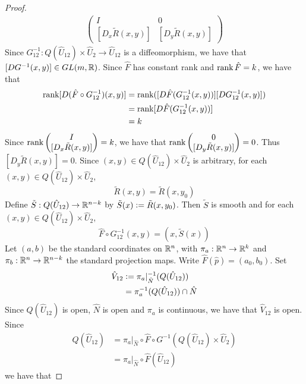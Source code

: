 \documentclass{book}
\begin{document}
\begin{proof}
\begin{align*}
\begin{pmatrix}
				I                & 0 \\
				[D_x \tilde{R}(x,y)]    & [D_y \tilde{R}(x,y)]   
			\end{pmatrix}
		\end{align*}
		Since $G_{12}^{-1}: Q(\hat{U}_{12}) \times \hat{U}_2 \rightarrow \hat{U}_{12}$ is a diffeomorphism, we have that $[DG^{-1}(x, y)] \in GL(m, \mathbb{R})$. Since $\hat{F}$ has constant rank and $\operatorname{\text{rank}} \hat{F} = k$, we have that
		\begin{align*}
			\operatorname{\text{rank}} [D(\hat{F} \circ G_{12}^{-1})(x,y)] 
			& = \operatorname{\text{rank}} ([D\hat{F}(G_{12}^{-1}(x,y))] [DG_{12}^{-1}(x,y)]) \\
			& = \operatorname{\text{rank}} [D\hat{F}(G_{12}^{-1}(x,y))] \\
			& = k
		\end{align*}
		Since $\operatorname{\text{rank}} 
		\begin{pmatrix}
			I \\
			[D_x \tilde{R}(x,y)]  
		\end{pmatrix}
		= k$, we have that $\operatorname{\text{rank}} 
		\begin{pmatrix}
		0 \\
		[D_y \tilde{R}(x,y)]  
		\end{pmatrix}
		= 0$. Thus $[D_y \tilde{R}(x,y)] = 0$. Since $(x,y) \in Q(\hat{U}_{12}) \times \hat{U}_2$ is arbitrary, for each $(x,y) \in Q(\hat{U}_{12}) \times \hat{U}_2$, 
		$$\tilde{R}(x, y) = \tilde{R}(x, y_0)$$
		Define $\tilde{S}: Q(\hat{U}_{12}) \rightarrow \mathbb{R}^{n-k}$ by $\tilde{S}(x) \vcentcolon= \tilde{R}(x, y_0)$. Then $\tilde{S}$ is smooth and for each $(x,y) \in Q(\hat{U}_{12}) \times \hat{U}_2$, 
		$$\hat{F} \circ G_{12}^{-1}(x,y) = (x, \tilde{S}(x))$$
		Let $(a, b)$ be the standard coordinates on $\mathbb{R}^n$, with $\pi_a: \mathbb{R}^n \rightarrow \mathbb{R}^k$ and $\pi_b: \mathbb{R}^n \rightarrow \mathbb{R}^{n-k}$ the standard projection maps. Write $\hat{F}(\hat{p}) = (a_0, b_0)$. Set 
		\begin{align*}
		 	\hat{V}_{12}
		 	& \vcentcolon= \pi_a|_{\hat{N}}^{-1}(Q(\hat{U}_{12})) \\
		 	& = \pi_a^{-1}(Q(\hat{U}_{12})) \cap \hat{N} 
		\end{align*}
		Since $Q(\hat{U}_{12})$ is open, $\hat{N}$ is open and $\pi_a$ is continuous, we have that $\hat{V}_{12}$ is open. Since 
		\begin{align*}
			Q(\hat{U}_{12})
		 	& = \pi_a|_{\hat{N}} \circ \hat{F} \circ G^{-1} (Q(\hat{U}_{12})  \times \hat{U}_2) \\
		 	& = \pi_a|_{\hat{N}} \circ \hat{F} (\hat{U}_{12})
		\end{align*}
	 	we have that 

\end{proof}
\end{document}
